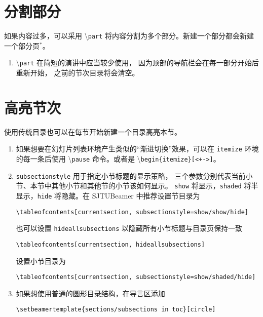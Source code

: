 \documentclass[
    UTF8,
    heading=true,
    12pt,
    a4paper
]{ctexrep}
\newenvironment{commentlist}
{\begin{enumerate}\small}
{\end{enumerate}}
\newcommand{\cmd}[1]{\textbackslash{}\texttt{#1}}
\newcommand{\env}[1]{\texttt{#1}}
\newcommand{\opt}[1]{\texttt{#1}}
\def\themename{\textsf{SJTUBeamer}}
\begin{document}
\section{分割部分}

如果内容过多，可以采用 \cmd{part}
将内容分割为多个部分。新建一个部分都会新建一个部分页$^*$。


\begin{commentlist}
  \item \cmd{part} 在简短的演讲中应当较少使用，
  因为顶部的导航栏会在每一部分开始后重新开始，
  之前的节次目录将会清空。
\end{commentlist}

\section{高亮节次}

使用传统目录也可以在每节开始新建一个目录高亮本节。


\begin{commentlist}
  \item 如果想要在幻灯片列表环境产生类似的“渐进切换”效果，可以在
  \env{itemize} 环境的每一条后使用 \cmd{pause} 命令。或者是
  \cmd{begin\{itemize\}[<+->]}。
  \item \opt{subsectionstyle} 用于指定小节标题的显示策略，
  三个参数分别代表当前小节、本节中其他小节和其他节的小节该如何显示。
  \opt{show} 将显示，\opt{shaded} 将半显示，\opt{hide}
  将隐藏。在 \themename{} 中推荐设置节目录为
  \begin{verbatim}\tableofcontents[currentsection, subsectionstyle=show/show/hide]\end{verbatim}
  也可以设置 \opt{hideallsubsections}
  以隐藏所有小节标题与目录页保持一致
  \begin{verbatim}\tableofcontents[currentsection, hideallsubsections]\end{verbatim}
  设置小节目录为
  \begin{verbatim}\tableofcontents[currentsection, subsectionstyle=show/shaded/hide]\end{verbatim}
  \item 如果想使用普通的圆形目录结构，在导言区添加
  \begin{verbatim}\setbeamertemplate{sections/subsections in toc}[circle]\end{verbatim}
\end{commentlist}
\end{document}
